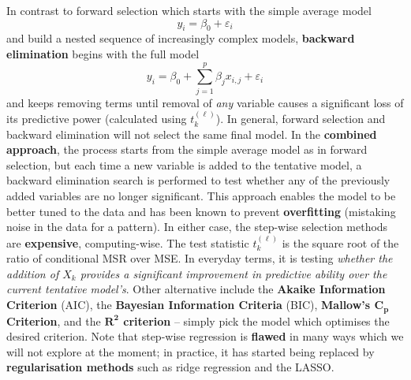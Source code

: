 In contrast to forward selection which starts with the simple average model $$y_{i}=\beta_{0}+\varepsilon_{i}$$ and build a nested sequence of increasingly complex models, \textbf{backward elimination} begins with the full model $${y}_{i}=\beta_{0}+\sum_{j=1}^{p}\beta_{j}x_{i,j}+\varepsilon_{i}$$ and keeps removing terms until removal of \textit{any} variable causes a significant loss of its predictive power (calculated using $t^{(\ell)}_{k}$). In general, forward selection and backward elimination will not select the same final model. 
\newpage\noindent
In the \textbf{combined approach}, the process starts from the simple average model as in forward selection, but each time a new variable is added to the tentative model, a backward elimination search is performed to test whether any of the previously added variables are no longer significant. This approach enables the model to be better tuned to the data and has been known to prevent \textbf{overfitting} (mistaking noise in the data for a pattern). In either case, the step-wise selection methods are \textbf{expensive}, computing-wise. 
\newl The test statistic $t^{(\ell)}_{k}$ is the square root of the ratio of conditional MSR over MSE. In everyday terms, it is testing \textit{whether the addition of $X_{k}$ provides a significant improvement in predictive ability over the current tentative model's}. Other alternative include the \textbf{Akaike Information Criterion} (AIC), the \textbf{Bayesian Information Criteria} (BIC), \textbf{Mallow's $\bm{C_{p}}$ Criterion}, and the \textbf{$\bm{R^2}$ criterion} -- simply pick the model which optimises the desired criterion. \newl Note that step-wise regression is \textbf{flawed} in many ways which we will not explore at the moment; in practice, it has  started being replaced by \textbf{regularisation methods} such as ridge regression and the LASSO.
